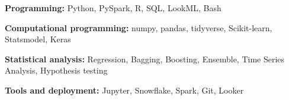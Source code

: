 
\textbf{Programming:} Python, PySpark, R, SQL, LookML, Bash

\textbf{Computational programming:} numpy, pandas, tidyverse, Scikit-learn, Statsmodel, Keras

\textbf{Statistical analysis:} Regression, Bagging, Boosting, Ensemble, Time Series Analysis, Hypothesis testing

\textbf{Tools and deployment:} Jupyter, Snowflake, Spark, Git, Looker